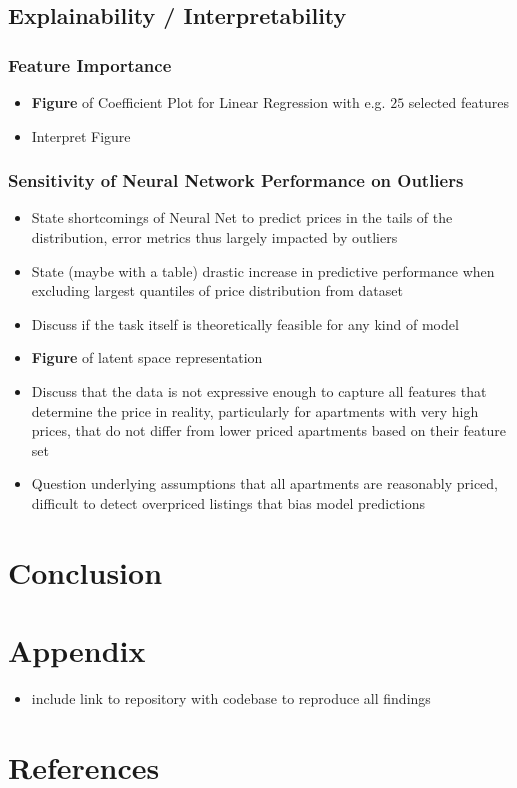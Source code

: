 \documentclass[12pt, letterpaper]{article}
\begin{document}
\subsection{Explainability / Interpretability} %

\subsubsection{Feature Importance} %
\begin{itemize}
    \item \textbf{Figure} of Coefficient Plot for Linear Regression with e.g. $25$ selected features
    \item Interpret Figure
\end{itemize}

\subsubsection{Sensitivity of Neural Network Performance on Outliers} %
\begin{itemize}
    \item State shortcomings of Neural Net to predict prices in the tails of the distribution, error metrics thus largely impacted by outliers
    \item State (maybe with a table) drastic increase in predictive performance when excluding largest quantiles of price distribution from dataset
    \item Discuss if the task itself is theoretically feasible for any kind of model
    \item \textbf{Figure} of latent space representation
    \item Discuss that the data is not expressive enough to capture all features that determine the price in reality, particularly for apartments with very high prices, that do not differ from lower priced apartments based on their feature set
    \item Question underlying assumptions that all apartments are reasonably priced, difficult to detect overpriced listings that bias model predictions
\end{itemize}


\section{Conclusion} %


\section{Appendix}
\begin{itemize}
    \item include link to repository with codebase to reproduce all findings
\end{itemize}

\section{References}
\end{document}
